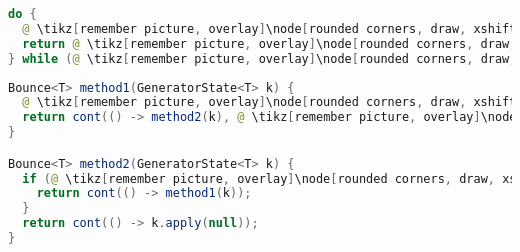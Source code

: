 \begin{center}
\begin{mdframed}[topline=true]
\begin{minipage}[t]{0.4\textwidth}
\begin{lstlisting}[language=Java, numbers=none, breaklines=true]
do {
  @ \tikz[remember picture, overlay]\node[rounded corners, draw, xshift=-0.1cm, inner sep=5pt, anchor=west] {Kódrészlet}; \vspace*{0.5cm} @ 
  return @ \tikz[remember picture, overlay]\node[rounded corners, draw, xshift=-0.1cm, inner sep=5pt, anchor=west, yshift=0.1cm] {Kifejezés}; \vspace*{0.3cm} @
} while (@ \tikz[remember picture, overlay]\node[rounded corners, draw, xshift=-0.1cm, inner sep=5pt, anchor=west, yshift=0.1cm] {Feltétel}; \vspace*{0.3cm} \hspace*{1.14cm}@);
\end{lstlisting}
\end{minipage} 
\begin{minipage}[t]{0.6\textwidth}
\begin{lstlisting}[language=Java, numbers=none, breaklines=true]
Bounce<T> method1(GeneratorState<T> k) {
  @ \tikz[remember picture, overlay]\node[rounded corners, draw, xshift=-0.1cm, inner sep=5pt, anchor=west] {Kódrészlet}; \vspace*{0.3cm} @
  return cont(() -> method2(k), @ \tikz[remember picture, overlay]\node[rounded corners, draw, xshift=-0.1cm, inner sep=5pt, anchor=west, yshift=0.1cm] {Kifejezés}; \vspace*{0.2cm} \hspace*{1.2cm} @);
}

Bounce<T> method2(GeneratorState<T> k) {
  if (@ \tikz[remember picture, overlay]\node[rounded corners, draw, xshift=-0.1cm, inner sep=5pt, anchor=west, yshift=0.1cm] {Feltétel}; \hspace*{1.04cm} @) {
    return cont(() -> method1(k));
  }
  return cont(() -> k.apply(null));
}
\end{lstlisting} 
\end{minipage}
\end{mdframed}
\end{center}


\pagebreak

